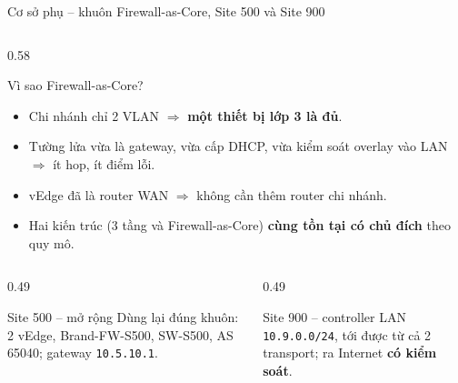 \documentclass[aspectratio=169, 10pt, xcolor={table}]{beamer}
\begin{document}
\begin{frame}{Cơ sở phụ -- khuôn Firewall-as-Core, Site 500 và Site 900}
\begin{columns}[c]
\begin{column}{0.58\textwidth}
\begin{card}{Vì sao Firewall-as-Core?}
\begin{itemize}
                    \item Chi nhánh chỉ 2 VLAN $\Rightarrow$ \textbf{một thiết bị lớp 3 là đủ}.
                    \item Tường lửa vừa là gateway, vừa cấp DHCP, vừa kiểm soát overlay vào LAN $\Rightarrow$ ít hop, ít điểm lỗi.
                    \item vEdge đã là router WAN $\Rightarrow$ không cần thêm router chi nhánh.
                    \item Hai kiến trúc (3 tầng và Firewall-as-Core) \textbf{cùng tồn tại có chủ đích} theo quy mô.
                \end{itemize}
            \end{card}
            \begin{columns}[T]
                \begin{column}{0.49\linewidth}
                    \begin{card}[accent]{Site 500 -- mở rộng}
                        \scriptsize Dùng lại đúng khuôn: 2 vEdge, Brand-FW-S500, SW-S500, AS 65040; gateway \texttt{10.5.10.1}.
                    \end{card}
                \end{column}
                \begin{column}{0.49\linewidth}
                    \begin{card}[okGreen]{Site 900 -- controller}
                        \scriptsize LAN \texttt{10.9.0.0/24}, tới được từ cả 2 transport; ra Internet \textbf{có kiểm soát}.
                    \end{card}
                \end{column}
            \end{columns}
        \end{column}
    \end{columns}
\end{frame}
\end{document}
